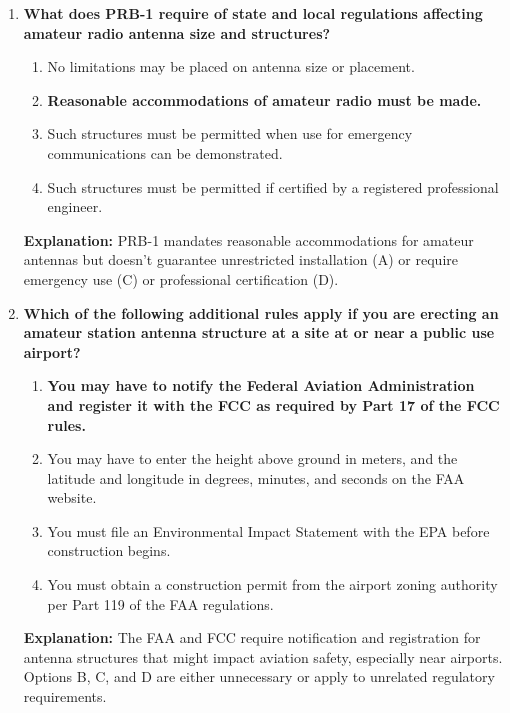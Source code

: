 \begin{enumerate}
    \item \textbf{What does PRB-1 require of state and local regulations affecting amateur radio antenna size and structures?}
    \begin{enumerate}
        \item No limitations may be placed on antenna size or placement.\\
        \item \textbf{Reasonable accommodations of amateur radio must be made.}\\
        \item Such structures must be permitted when use for emergency communications can be demonstrated.\\
        \item Such structures must be permitted if certified by a registered professional engineer.
    \end{enumerate}
    \textbf{Explanation:} PRB-1 mandates reasonable accommodations for amateur antennas but doesn’t guarantee unrestricted installation (A) or require emergency use (C) or professional certification (D).

\item \textbf{Which of the following additional rules apply if you are erecting an amateur station antenna structure at a site at or near a public use airport?}
\begin{enumerate}
    \item \textbf{You may have to notify the Federal Aviation Administration and register it with the FCC as required by Part 17 of the FCC rules.}\\
    \item You may have to enter the height above ground in meters, and the latitude and longitude in degrees, minutes, and seconds on the FAA website.\\
    \item You must file an Environmental Impact Statement with the EPA before construction begins.\\
    \item You must obtain a construction permit from the airport zoning authority per Part 119 of the FAA regulations.
\end{enumerate}
\textbf{Explanation:} The FAA and FCC require notification and registration for antenna structures that might impact aviation safety, especially near airports. Options B, C, and D are either unnecessary or apply to unrelated regulatory requirements.


\end{enumerate}
